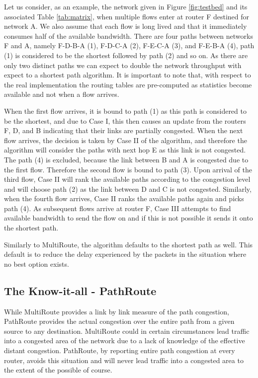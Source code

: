 Let us consider, as an example, the network given in Figure
\ref{fig:testbed} and its associated Table \ref{tab:matrix}, when multiple
flows enter at router F destined for network A. We also assume that each flow is
long lived  and that it immediately consumes half of the available bandwidth.
There are four paths between networks F and A, namely F-D-B-A (1), F-D-C-A (2),
F-E-C-A (3), and F-E-B-A (4), path (1) is considered to be the shortest followed
by path (2) and so on. As there are only two distinct paths we can expect to
double the network throughput with expect to a shortest path algorithm. It is
important to note that, with respect to the real implementation the routing
tables are pre-computed as statistics become available and not when a flow
arrives.

When the first flow arrives, it is bound to path (1) as this path is considered
to be the shortest, and due to Case I, this then causes an update from the
routers F, D, and B indicating that their links are partially congested. When
the next flow arrives, the decision is taken by Case II of the algorithm, and
therefore the algorithm will consider the paths with next hop E as this link is
not congested. The path (4) is excluded, because the link between B and A is
congested due to the first flow. Therefore the second flow is bound to path
(3). Upon arrival of the third flow, Case II will rank the available paths
according to the congestion level and will choose path (2) as the link between
D and C is not congested. Similarly, when the fourth flow arrives, Case II
ranks the available paths again and picks path (4). As subsequent flows arrive
at router F, Case III attempts to find available bandwidth to send the flow on
and if this is not possible it sends it onto the shortest path.


Similarly to MultiRoute, the algorithm defaults to the shortest path as well. This default is to reduce the delay experienced by the packets in the situation where no best option exists. 
  

\subsection{The Know-it-all - PathRoute}

While MultiRoute provides a link by link measure of the path congestion, PathRoute provides the actual congestion over the entire path from a given source to any destination. MultiRoute could in certain circumstances lead traffic into a congested area of the network due to a lack of knowledge of the effective distant congestion. PathRoute, by reporting entire path congestion at every router, avoids this situation and will never lead traffic into a congested area to the extent of the possible of course. 

